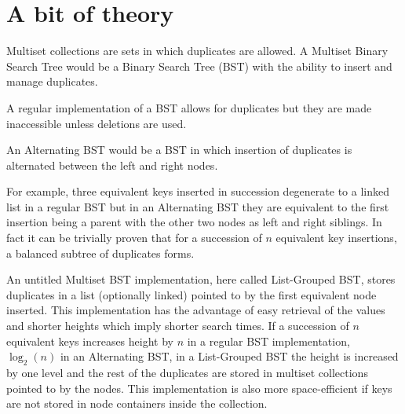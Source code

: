 \documentclass[fleqn,10pt]{SelfArx} %
\begin{document}
\maketitle %

\tableofcontents %

\thispagestyle{empty} %


\section*{A bit of theory} %

Multiset collections are sets in which duplicates are allowed. A Multiset Binary Search Tree would be a Binary Search Tree (BST) with the ability to insert and manage duplicates.

A regular implementation of a BST allows for duplicates but they are made inaccessible unless deletions are used.

An Alternating BST would be a BST in which insertion of duplicates is alternated between the left and right nodes.

For example, three equivalent keys inserted in succession degenerate to a linked list in a regular BST but in an Alternating BST they are equivalent to the first insertion being a parent with the other two nodes as left and right siblings. In fact it can be trivially proven that for a succession of $n$ equivalent key insertions, a balanced subtree of duplicates forms.

An untitled Multiset BST implementation, here called List-Grouped BST, stores duplicates in a list (optionally linked) pointed to by the first equivalent node inserted. This implementation has the advantage of easy retrieval of the values and shorter heights which imply shorter search times. If a succession of $n$ equivalent keys increases height by $n$ in a regular BST implementation, $\log_2(n)$ in an Alternating BST, in a List-Grouped BST the height is increased by one level and the rest of the duplicates are stored in multiset collections pointed to by the nodes. This implementation is also more space-efficient if keys are not stored in node containers inside the collection.
\end{document}
